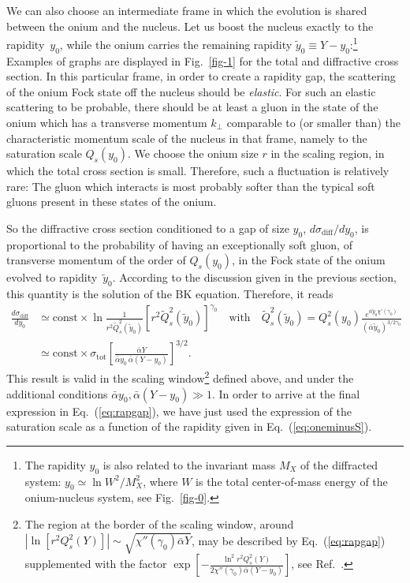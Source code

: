 \documentclass{webofc}
\def\be{\begin{equation}}
\def\ee{\end{equation}}
\begin{document}
We can also choose an intermediate frame in which the evolution is shared between the
onium and the nucleus. Let us boost the nucleus exactly to the rapidity~$y_0$, while
the onium carries the remaining rapidity $\tilde y_0\equiv Y-y_0$:\footnote{
  The rapidity $y_0$ is also related to the invariant mass $M_X$ of the
  diffracted system: $y_0\simeq \ln W^2/M_X^2$, where $W$ is the total center-of-mass
  energy of the onium-nucleus system, see Fig.~\ref{fig-0}.
}
Examples of
graphs are displayed in Fig.~\ref{fig-1} for the total and diffractive cross section.
In this particular frame, in order to create a rapidity gap, the scattering of the
onium Fock state off the nucleus should be {\it elastic}. For such an elastic scattering
to be probable, there should be
at least a gluon in the state of the onium which has a transverse momentum $k_\perp$ comparable
to (or smaller than)
the characteristic momentum scale of the nucleus in that frame, namely to the
saturation scale $Q_s(y_0)$. We choose the onium size $r$ in the scaling region, in which
the total cross section is small. Therefore,
such a fluctuation is relatively rare: The gluon which interacts is most probably
softer than the typical soft gluons present in these states of the onium. 

So the diffractive cross section conditioned to a gap of size $y_0$,
$d\sigma_\text{diff}/dy_0$,
is proportional to the
probability of having an exceptionally soft gluon, of transverse momentum of the
order of $Q_s(y_0)$, in the Fock state of the onium evolved to rapidity~$\tilde y_0$.
According to the discussion given in the previous section, this quantity
is the solution of the BK equation. Therefore, it reads
\be
\begin{split}
\frac{d\sigma_\text{diff}}{dy_0}&\simeq\text{const}\times
\ln\frac{1}{r^2 \tilde Q_s^2(\tilde y_0)}
\left[r^2 \tilde Q_s^2(\tilde y_0)\right]^{\gamma_0}
\quad \text{with}\quad \tilde Q_s^2(\tilde y_0)=
Q_s^2(y_0)\frac{e^{\bar\alpha\tilde y_0\chi'(\gamma_0)}}{(\bar\alpha\tilde y_0)^{3/2\gamma_0}}\\
&\simeq \text{const}\times\sigma_\text{tot}\left[
  \frac{\bar\alpha Y}{\bar\alpha y_0\,\bar\alpha(Y-y_0)}
  \right]^{3/2}.
\end{split}
\label{eq:rapgap}
\ee
This result is valid in the scaling window\footnote{The region at the border of the scaling window,
  around $|\ln [r^2Q_s^2(Y)]|\sim \sqrt{\chi''(\gamma_0)\bar\alpha Y}$, may be described by Eq.~(\ref{eq:rapgap})
  supplemented with the factor $\exp\left[-\frac{\ln^2 r^2Q_s^2(Y)}{2\chi''(\gamma_0)\bar\alpha (Y-y_0)}\right]$,
  see Ref.~\cite{Mueller:2018ned}.} defined above, and under the additional conditions
$\bar\alpha y_0,\bar\alpha(Y-y_0)\gg 1$.
In order to arrive at the final expression in Eq.~(\ref{eq:rapgap}), we have just used the expression
of the saturation scale as a function of the rapidity given in Eq.~(\ref{eq:oneminusS}).
\end{document}
